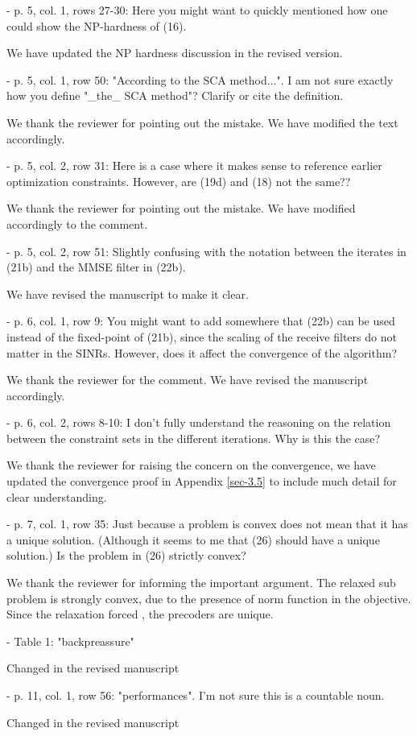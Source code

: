  - p. 5, col. 1, rows 27-30: Here you might want to quickly mentioned how one could show the NP-hardness of (16).

\resp We have updated the NP hardness discussion in the revised version.

 - p. 5, col. 1, row 50: "According to the SCA method...". I am not sure exactly how you define "\_the\_ SCA method"? Clarify or cite the definition.

\resp We thank the reviewer for pointing out the mistake. We have modified the text accordingly.

 - p. 5, col. 2, row 31: Here is a case where it makes sense to reference earlier optimization constraints. However, are (19d) and (18) not the same??

\resp We thank the reviewer for pointing out the mistake. We have modified accordingly to the comment.

 - p. 5, col. 2, row 51: Slightly confusing with the notation between the iterates in (21b) and the MMSE filter in (22b).

\resp We have revised the manuscript to make it clear.

 - p. 6, col. 1, row 9: You might want to add somewhere that (22b) can be used instead of the fixed-point of (21b), since the scaling of the receive filters do not matter in the SINRs. However, does it affect the convergence of the algorithm?

\resp We thank the reviewer for the comment. We have revised the manuscript accordingly.

 - p. 6, col. 2, rows 8-10: I don't fully understand the reasoning on the relation between the constraint sets in the different iterations. Why is this the case?

\resp We thank the reviewer for raising the concern on the convergence, we have updated the convergence proof in Appendix \ref{sec-3.5} to include much detail for clear understanding.


 - p. 7, col. 1, row 35: Just because a problem is convex does not mean that it has a unique solution. (Although it seems to me that (26) should have a unique solution.) Is the problem in (26) strictly convex?

\resp We thank the reviewer for informing the important argument. The relaxed sub problem is strongly convex, due to the presence of norm function in the objective. Since the relaxation forced , the precoders are unique.

 - Table 1: "backpreassure"

\resp Changed in the revised manuscript

 - p. 11, col. 1, row 56: "performances". I'm not sure this is a countable noun.

\resp Changed in the revised manuscript

